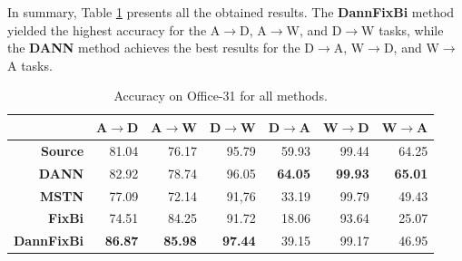 In summary, Table \ref{tab:all} presents all the obtained results. The \textbf{DannFixBi} method yielded the highest accuracy for the A$\rightarrow$D, A$\rightarrow$W, and D$\rightarrow$W tasks, while the \textbf{DANN} method achieves the best results for the D$\rightarrow$A, W$\rightarrow$D, and W$\rightarrow$A tasks.

\begin{table}[h]
\centering
\caption{Accuracy on Office-31 for all methods.}
\label{tab:all}
\begin{tabular}{|r|r|r|r|r|r|r|}
\hline
\multicolumn{1}{|l|}{} & \multicolumn{1}{l|}{A$\rightarrow$D} & \multicolumn{1}{l|}{A$\rightarrow$W} & \multicolumn{1}{l|}{D$\rightarrow$W} & \multicolumn{1}{l|}{D$\rightarrow$A} & \multicolumn{1}{l|}{W$\rightarrow$D} & \multicolumn{1}{l|}{W$\rightarrow$A} \\ \hline
\textbf{Source} & 81.04 & 76.17 & 95.79 & 59.93 & 99.44 & 64.25 \\ \hline
\textbf{DANN} & 82.92 & 78.74 & 96.05 & \textbf{64.05} & \textbf{99.93} & \textbf{65.01} \\ \hline
\textbf{MSTN} & 77.09 & 72.14 & 91,76 & 33.19 & 99.79 & 49.43 \\ \hline
\textbf{FixBi} & 74.51 & 84.25 & 91.72 & 18.06 & 93.64 & 25.07 \\ \hline
\textbf{DannFixBi} & \textbf{86.87} & \textbf{85.98} & \textbf{97.44} & 39.15 & 99.17 & 46.95 \\ \hline
\end{tabular}
\end{table}